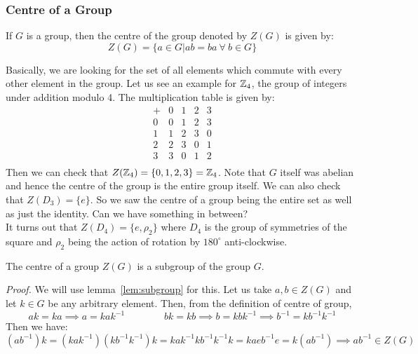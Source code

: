 \subsubsection{Centre of a Group}
\begin{definition}[Centre]
    If $G$ is a group, then the centre of the group denoted by $Z(G)$ is given by:
    $$Z(G) = \{a\in G| ab=ba \ \forall \ b\in G\}$$
\end{definition}
Basically, we are looking for the set of all elements which commute with every other element in the group. Let us see an example for $\mathbb{Z}_4$, the group of integers under addition modulo 4. The multiplication table is given by:
\[
\begin{array}{c|cccc}
  + & 0 & 1 & 2 & 3 \\
  \hline
  0 & 0 & 1 & 2 & 3 \\
  1 & 1 & 2 & 3 & 0 \\
  2 & 2 & 3 & 0 & 1 \\
  3 & 3 & 0 & 1 & 2 \\
\end{array}
\]
Then we can check that $Z(\mathbb{Z}_4) = \{0,1,2,3\}=\mathbb{Z}_4$. Note that $G$ itself was abelian and hence the centre of the group is the entire group itself. We can also check that $Z(D_3) = \{e\}$. So we saw the centre of a group being the entire set as well as just the identity. Can we have something in between? \\[0.3cm]
It turns out that $Z(D_4) = \{e,\rho_2\}$ where $D_4$ is the group of symmetries of the square and $\rho_2$ being the action of rotation by $180^\circ$ anti-clockwise.
\begin{lemma}
    The centre of a group $Z(G)$ is a subgroup of the group $G$. 
\end{lemma}
\textit{Proof.} We will use lemma~\ref{lem:subgroup} for this. Let us take $a,b\in Z(G)$ and let $k\in G$ be any arbitrary element. Then, from the definition of centre of group, 
$$ak = ka\implies a = kak^{-1} \qquad \qquad bk = kb\implies b = kbk^{-1}\implies b^{-1} = kb^{-1}k^{-1}$$
Then we have:
$$(ab^{-1})k = (kak^{-1})(kb^{-1}k^{-1})k = kak^{-1}k b^{-1}k^{-1}k = kaeb^{-1}e = k (ab^{-1})\implies ab^{-1}\in Z(G)$$
